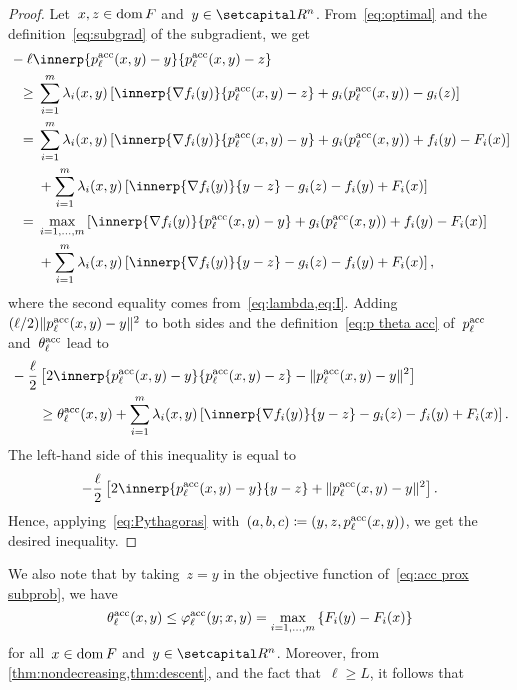 \documentclass[../main]{subfiles}
\begin{document}
\begin{proof}
    Let~$x, z \in \operatorname{dom} F$ and~$y \in \setR^n$.
    From~\cref{eq:optimal} and the definition~\cref{eq:subgrad} of the subgradient, we get
    \begin{align}
        \MoveEqLeft - \ell \innerp{p^\acc_\ell(x, y) - y}{p^\acc_\ell(x, y) - z} \\
        \ge{}& \sum_{i = 1}^{m} \lambda_i(x, y) \left[ \innerp{\nabla f_i(y)}{p^\acc_\ell(x, y) - z} + g_i(p^\acc_\ell(x, y)) - g_i(z) \right] \\
        ={}& \sum_{i = 1}^{m} \lambda_i(x, y) \left[ \innerp{\nabla f_i(y)}{p^\acc_\ell(x, y) - y} + g_i(p^\acc_\ell(x, y)) + f_i(y) - F_i(x) \right] \\
         &+ \sum_{i = 1}^{m} \lambda_i(x, y) \left[ \innerp{\nabla f_i(y)}{y - z} - g_i(z) - f_i(y) + F_i(x) \right] \\
        ={}& \max_{i = 1, \dots, m} \left[ \innerp{\nabla f_i(y)}{p^\acc_\ell(x, y) - y} + g_i(p^\acc_\ell(x, y)) + f_i(y) - F_i(x) \right] \\
         &+ \sum_{i = 1}^{m} \lambda_i(x, y) \left[ \innerp{\nabla f_i(y)}{y - z} - g_i(z) - f_i(y) + F_i(x) \right]
    ,\end{align}
    where the second equality comes from~\cref{eq:lambda,eq:I}.
    Adding~$(\ell / 2) \lVert p^{\mathrm{acc}}_\ell(x, y) - y\rVert^2$ to both sides and the definition~\cref{eq:p theta acc} of~$p^{\mathrm{acc}}_\ell$ and~$\theta^{\mathrm{acc}}_\ell$ lead to
    \begin{align}
        \MoveEqLeft - \frac{\ell}{2} \left[ 2 \innerp{p^\acc_\ell(x, y) - y}{p^\acc_\ell(x, y) - z} - \norm{p^\acc_\ell(x, y) - y}^2 \right] \\
        &\ge \theta^\acc_\ell(x, y) + \sum_{i = 1}^{m} \lambda_i(x, y) \left[ \innerp{\nabla f_i(y)}{y - z} - g_i(z) - f_i(y) + F_i(x) \right]
    .\end{align}
    The left-hand side of this inequality is equal to
    \[
        - \frac{\ell}{2} \left[ 2 \innerp{p^\acc_\ell(x, y) - y}{y - z} + \norm{p^\acc_\ell(x, y) - y}^2 \right]
    .\]
    Hence, applying~\cref{eq:Pythagoras} with~$(a, b, c) \coloneqq (y, z, p^{\mathrm{acc}}_\ell(x, y))$, we get the desired inequality.
\end{proof}
We also note that by taking~$z = y$ in the objective function of~\cref{eq:acc prox subprob}, we have
\[ \label{eq:acc prox subprob optimality}
    \theta^{\mathrm{acc}}_\ell(x, y) \le \varphi^{\mathrm{acc}}_\ell(y; x, y) = \max_{i = 1, \dots, m}\left\{ F_i(y) - F_i(x) \right\}
\]
for all~$x \in \operatorname{dom} F$ and~$y \in \setR^n$.
Moreover, from \cref{thm:nondecreasing,thm:descent}, and the fact that~$\ell \ge L$, it follows that
\end{document}
